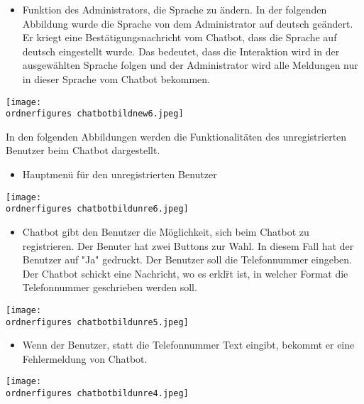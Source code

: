 \begin{itemize}
	\item Funktion des Administrators, die Sprache zu \"andern. In der folgenden Abbildung wurde die Sprache von dem Administrator auf deutsch ge\"andert. Er kriegt eine Best\"atigungsnachricht vom Chatbot, dass die Sprache auf deutsch eingestellt wurde. Das bedeutet, dass die Interaktion wird in der ausgew\"ahlten Sprache folgen und der Administrator wird alle Meldungen nur in dieser Sprache vom Chatbot bekommen.
\end{itemize}
\begin{center}
	\captionsetup{type=figure}
	\texttt{[image: \\ordnerfigures chatbotbildnew6.jpeg]}
	\caption{Spracheinstellungen}
	\label{fig:sprachek} 
	\captionsetup{type=figure} 
\end{center}
In den folgenden Abbildungen werden die Funktionalitäten des unregistrierten Benutzer beim Chatbot dargestellt.
\begin{itemize}
	\item Hauptmen\"u f\"ur den unregistrierten Benutzer
\end{itemize}
\begin{center}
	\captionsetup{type=figure}
	\texttt{[image: \\ordnerfigures chatbotbildunre6.jpeg]}
	\caption{Hauptmen\"u f\"ur den unregistrierten Benutzer}
	\label{fig:chaftboregistr}
\end{center}
\begin{itemize}
	\item Chatbot gibt den Benutzer die Möglichkeit, sich beim Chatbot zu registrieren. Der Benuter hat zwei Buttons zur Wahl. In diesem Fall hat der Benutzer auf "Ja" gedruckt. Der Benutzer soll die Telefonnummer eingeben. Der Chatbot schickt eine Nachricht, wo es erkl\"rt ist, in welcher Format die Telefonnummer geschrieben werden soll.
\end{itemize}
\begin{center}
	\captionsetup{type=figure}
	\texttt{[image: \\ordnerfigures chatbotbildunre5.jpeg]}
	\caption{Registrierung beim Chatbot}
	\label{fig:chfdsatboregistr}
\end{center}
\begin{itemize}
	\item Wenn der Benutzer, statt die Telefonnummer Text eingibt, bekommt er eine Fehlermeldung von Chatbot.
\end{itemize}
\begin{center}
	\captionsetup{type=figure}
	\texttt{[image: \\ordnerfigures chatbotbildunre4.jpeg]}
	\caption{Falsche Eingabe des Telefonnummers}
	\label{fig:chfdsatboregistrfds}
\end{center}
